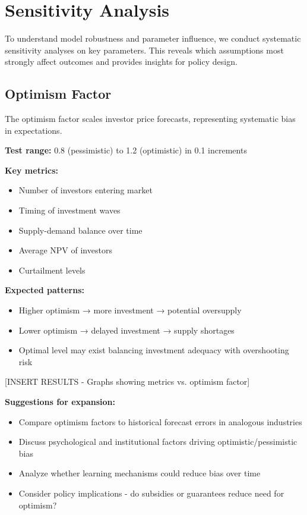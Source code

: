 \documentclass[10.5pt]{article}
\begin{document}
\newpage
\section{Sensitivity Analysis}

To understand model robustness and parameter influence, we conduct systematic sensitivity analyses on key parameters. This reveals which assumptions most strongly affect outcomes and provides insights for policy design.

\subsection{Optimism Factor}

The optimism factor scales investor price forecasts, representing systematic bias in expectations.

\textbf{Test range:} 0.8 (pessimistic) to 1.2 (optimistic) in 0.1 increments

\textbf{Key metrics:}
\begin{itemize}
    \item Number of investors entering market
    \item Timing of investment waves
    \item Supply-demand balance over time
    \item Average NPV of investors
    \item Curtailment levels
\end{itemize}

\textbf{Expected patterns:}
\begin{itemize}
    \item Higher optimism → more investment → potential oversupply
    \item Lower optimism → delayed investment → supply shortages
    \item Optimal level may exist balancing investment adequacy with overshooting risk
\end{itemize}

[INSERT RESULTS - Graphs showing metrics vs. optimism factor]

\textbf{Suggestions for expansion:}
\begin{itemize}
    \item Compare optimism factors to historical forecast errors in analogous industries
    \item Discuss psychological and institutional factors driving optimistic/pessimistic bias
    \item Analyze whether learning mechanisms could reduce bias over time
    \item Consider policy implications - do subsidies or guarantees reduce need for optimism?
\end{itemize}
\end{document}
